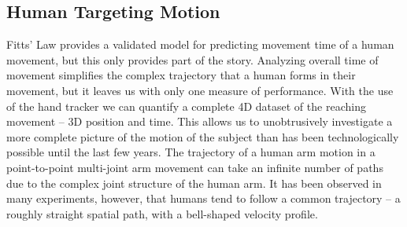 \subsection{Human Targeting Motion}
\label{human-targeting-motion-trajectories}
%
%
Fitts' Law provides a validated model for predicting movement time of a human movement, but this only provides part of the story.
Analyzing overall time of movement simplifies the complex trajectory that a human forms in their movement, but it leaves us with only one measure of performance.
With the use of the hand tracker we can quantify a complete 4D dataset of the reaching movement -- 3D position and time.
This allows us to unobtrusively investigate a more complete picture of the motion of the subject than has been technologically possible until the last few years.
The trajectory of a human arm motion in a point-to-point multi-joint arm movement can take an infinite number of paths due to the complex joint structure of the human arm.
It has been observed in many experiments, however, that humans tend to follow a common trajectory -- a roughly straight spatial path, with a bell-shaped velocity profile.
%
%
%
